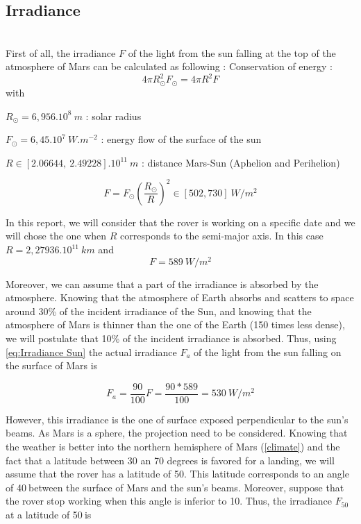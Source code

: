 \subsection{Irradiance}
\label{Irradiance}
~\\
First of all, the irradiance $F$ of the light from the sun falling at the top of the atmosphere of Mars can be calculated as following :
Conservation of energy :
\begin{equation}
\label{eq:conservation of energy}
4\pi R_\odot^2F_\odot=4\pi R^2F
\end{equation}
with 

$R_\odot=6,956.10^8\ m$ : solar radius

$F_\odot=6,45.10^7\ W.m^{-2}$ : energy flow of the surface of the sun

$R \in [2.06644,\ 2.49228].10^{11} \ m$ : distance Mars-Sun (Aphelion and Perihelion)

\begin{equation}
\label{eq:Irradiance Sun range}
F = F_\odot \left(\frac{R_\odot}{R}\right)^2 \in [502, 730]\ W/m^2
\end{equation}

In this report, we will consider that the rover is working on a specific date and we will chose the one when $R$ corresponds to the semi-major axis. In this case $R=2,27936.10^{11}\ km$ and
\begin{equation}
\label{eq:Irradiance Sun}
F = 589\ W/m^2
\end{equation}



Moreover, we can assume that a part of the irradiance is absorbed by the atmosphere. Knowing that the atmosphere of Earth absorbs and scatters to space around 30\% of the incident irradiance of the Sun\cite{yamamoto1962direct}, and knowing  that the atmosphere of Mars is thinner than the one of the Earth (150 times less dense), we will postulate that 10\% of the incident irradiance is absorbed. Thus, using \eqref{eq:Irradiance Sun} the actual irradiance $F_a$ of the light from the sun falling on the surface of Mars is

\begin{equation}
\label{eq:Actual Irradiance Sun}
F_a = \frac{90}{100}F = \frac{90*589}{100} = 530\ W/m^2
\end{equation}

However, this irradiance is the one of surface exposed perpendicular to the sun's beams. As Mars is a sphere, the projection need to be considered.
Knowing that the weather is better into the northern hemisphere of Mars (\ref{climate}) and the fact that a latitude between 30 an 70 degrees is favored for a landing\cite{latitude}, we will assume that the rover has a latitude of 50\textdegree. This latitude corresponds to an angle of 40\textdegree$\ $between the surface of Mars and the sun's beams. Moreover, suppose that the rover stop working when this angle is inferior to 10\textdegree. Thus, the irradiance $F_{50}$ at a latitude of 50\textdegree$\ $is

